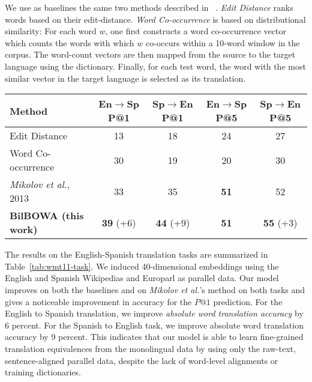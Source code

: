 \documentclass[10pt]{article}
\newcommand\bld[1]{\textbf{#1}}
\begin{document}
We use as baselines the same two methods described in ~\cite{mikolov2013exploiting}. 
\emph{Edit Distance} ranks words based on their edit-distance. \emph{Word Co-occurrence} is
based on distributional similarity: For each word $w$, one first constructs a
word co-occurrence vector which counts the words with which $w$ co-occurs
within a 10-word window in the corpus. The word-count vectors are then mapped from the source
to the target language using the dictionary. Finally, for each test word, the word
with the most similar vector in the target language is selected as its translation.


\begin{table*}
  \small
  \centering 
  \begin{tabular}{l|c|c||c|c}
    \hline
    \bld{Method} & \bld{En$\rightarrow$Sp P@1} &  \bld{Sp$\rightarrow$En P@1} &  \bld{En$\rightarrow$Sp P@5} & \bld{Sp$\rightarrow$En P@5} \\
    \hline
    Edit Distance & 13 & 18 & 24 & 27 \\
    Word Co-occurrence & 30 & 19 & 20 & 30 \\
   \emph{Mikolov et al.}, 2013 & 33 & 35 & \bld{51} & 52 \\
   \textbf{BilBOWA (this work)} & \bld{39} (+6) & \bld{44} (+9) & \bld{51} & \bld{55} (+3) \\
   \hline
  \end{tabular}
  \caption{Results for the translation task measured as word translation
  accuracy (out of 100, higher is better) evaluated on the top-1 and top-5 words 
  as ranked by the method. Cross-lingual embeddings are induced and distance in 
  the embedded space are used to select word translation pairs. $+x$ indicates 
  improvement in absolute precision over the previous state-of-the-art on this 
  task~\cite{mikolov2013exploiting}. }
  \label{tab:wmt11-task}
\end{table*}

The results on the English-Spanish translation tasks are summarized in
Table~\ref{tab:wmt11-task}. We induced 40-dimensional embeddings using the
English and Spanish Wikipedias and Europarl as parallel data. Our model
improves on both the baselines and on \emph{Mikolov et al.}'s method on both
tasks and gives a noticeable improvement in accuracy for the $P@1$ prediction.
For the English to Spanish translation, we improve \emph{absolute word
translation accuracy} by 6 percent. For the Spanish to English task, we improve
absolute word translation accuracy by 9 percent. This indicates that our model
is able to learn fine-grained translation equivalences from the monolingual
data by using only the raw-text, sentence-aligned parallel data, despite the
lack of word-level alignments or training dictionaries.
\end{document}
